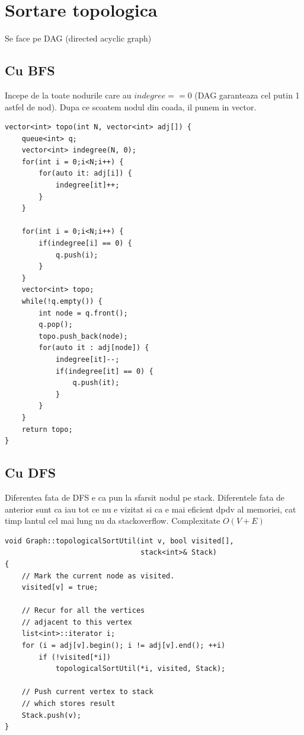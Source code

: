 \documentclass{article}
\begin{document}
    \section{Sortare topologica} 
    Se face pe DAG (directed acyclic graph)
    \subsection*{Cu BFS} Incepe de la toate nodurile care au $indegree == 0$ (DAG garanteaza cel putin 1 astfel de nod). Dupa ce scoatem nodul din coada, il punem in vector.
    \begin{lstlisting}
vector<int> topo(int N, vector<int> adj[]) {
    queue<int> q; 
    vector<int> indegree(N, 0); 
    for(int i = 0;i<N;i++) {
        for(auto it: adj[i]) {
            indegree[it]++; 
        }
    }
    
    for(int i = 0;i<N;i++) {
        if(indegree[i] == 0) {
            q.push(i); 
        }
    }
    vector<int> topo;
    while(!q.empty()) {
        int node = q.front(); 
        q.pop(); 
        topo.push_back(node);
        for(auto it : adj[node]) {
            indegree[it]--;
            if(indegree[it] == 0) {
                q.push(it); 
            }
        }
    }
    return topo;
}
    \end{lstlisting}
    \subsection*{Cu DFS} Diferentea fata de DFS e ca pun la sfarsit nodul pe stack. Diferentele fata de anterior sunt ca iau tot ce nu e vizitat si ca e mai eficient dpdv al memoriei, cat timp lantul cel mai lung nu da stackoverflow. Complexitate $O(V+E)$

    \begin{lstlisting}
void Graph::topologicalSortUtil(int v, bool visited[],
                                stack<int>& Stack)
{
    // Mark the current node as visited.
    visited[v] = true;
 
    // Recur for all the vertices
    // adjacent to this vertex
    list<int>::iterator i;
    for (i = adj[v].begin(); i != adj[v].end(); ++i)
        if (!visited[*i])
            topologicalSortUtil(*i, visited, Stack);
 
    // Push current vertex to stack
    // which stores result
    Stack.push(v);
}
    \end{lstlisting}
\end{document}

